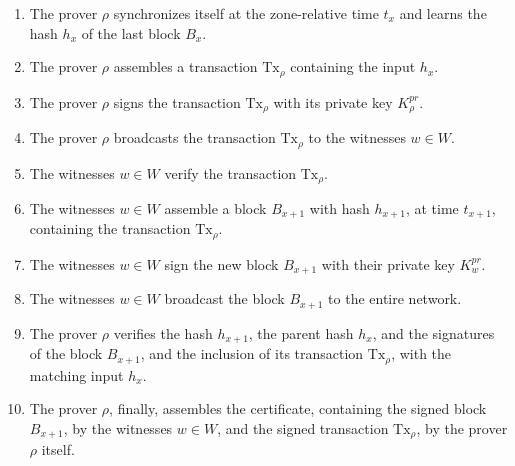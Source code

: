 \begin{enumerate}
    \item The prover $\rho$ synchronizes itself at the zone-relative time $t_x$ and learns the hash  $h_x$ of the last block $B_{x}$.
    \item The prover $\rho$ assembles a transaction $\text{Tx}_\rho$ containing the input $h_x$.
    \item The prover $\rho$ signs the transaction $\text{Tx}_\rho$ with its private key $K^{pr}_\rho$.
    \item The prover $\rho$ broadcasts the transaction $\text{Tx}_\rho$ to the witnesses $w \in W$.
    \item The witnesses $w \in W$ verify the transaction $\text{Tx}_\rho$.
    \item The witnesses $w \in W$ assemble a block $B_{x+1}$ with hash $h_{x+1}$, at time $t_{x+1}$, containing the transaction $\text{Tx}_\rho$.
    \item The witnesses $w \in W$ sign the new block $B_{x+1}$ with their private key $K^{pr}_w$.
    \item The witnesses $w \in W$ broadcast the block $B_{x+1}$ to the entire network.
    \item The prover $\rho$ verifies the hash $h_{x+1}$, the parent hash $h_{x}$, and the signatures of the block $B_{x+1}$, and the inclusion of its transaction $\text{Tx}_\rho$, with the matching input $h_{x}$.
    \item The prover $\rho$, finally, assembles the \pol{} certificate, containing the signed block $B_{x+1}$, by the witnesses $w \in W$, and the signed transaction $\text{Tx}_\rho$, by the prover $\rho$ itself.
\end{enumerate}

